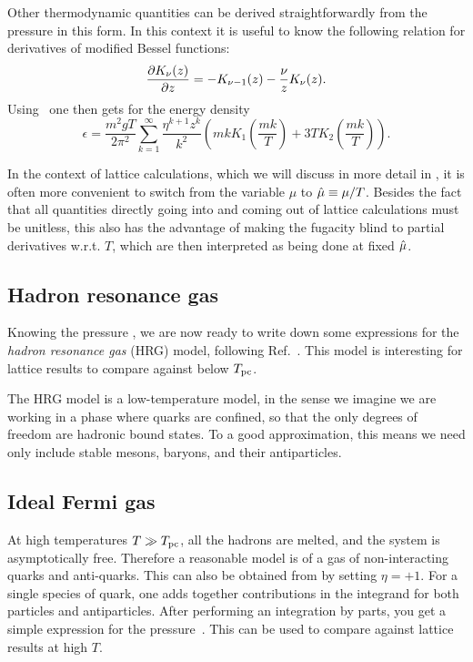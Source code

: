 Other thermodynamic quantities can be derived straightforwardly
from the pressure in this form. In this context it is useful to know
the following relation for derivatives of modified Bessel functions:
\begin{equation}
  \pdv{K_\nu(z)}{z}=-K_{\nu-1}(z)-\frac{\nu}{z}K_\nu(z).
\end{equation}
Using~ one then gets for the energy density
\begin{equation}\label{eq:edensityQM}
  \epsilon=\frac{m^2gT}{2\pi^2}\sum_{k=1}^\infty\frac{\eta^{k+1}z^k}{k^2}
              \left( mk K_1\left(\frac{mk}{T}\right) 
                    + 3TK_2\left(\frac{mk}{T}\right) \right).
\end{equation}

In the context of lattice calculations, which we will discuss in more
detail in , it is often more convenient to switch
from the variable $\mu$ to $\hat{\mu}\equiv\mu/T$. Besides the fact that
all quantities directly going into and coming out of lattice calculations
must be unitless, this also has the advantage of making the
fugacity blind to partial derivatives w.r.t. $T$, which are then 
interpreted as being done at fixed $\hat{\mu}$.

\subsection{Hadron resonance gas}\label{sec:HRG}

Knowing the pressure , we are now ready to write down
some expressions for the {\it hadron resonance gas} (HRG) model,
following Ref.~\cite{karsch_probing_2011}. This model is interesting for lattice
results to compare against below $T_{\rm pc}$. 

The HRG model is a low-temperature model, in the sense we imagine we are working
in a phase where quarks are confined, so that the only degrees of freedom are
hadronic bound states. To a good approximation, this means we need only include
stable mesons, baryons, and their antiparticles.

\subsection{Ideal Fermi gas}\label{sec:fermi}

At high temperatures $T\gg T_{\rm pc}$, all the hadrons are melted, and the system is
asymptotically free. Therefore a reasonable model is of a gas of non-interacting
quarks and anti-quarks. This can also be obtained from 
by setting $\eta=+1$. For a single species of quark, one adds together
contributions in the integrand for both particles and antiparticles.
After performing an integration by parts, you get a simple expression for the
pressure~\cite{hegde_lattice_2008}. 
This can be used to compare against lattice results at high $T$.

